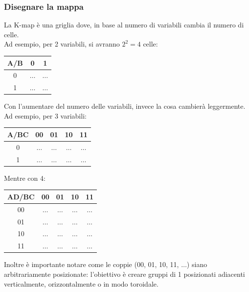 \documentclass[12pt]{article}
\begin{document}
\subsubsection{Disegnare la mappa}
La K-map è una griglia dove, in base al numero di variabili cambia il numero di celle.\\
Ad esempio, per 2 variabili, si avranno $2^2 = 4$ celle:
\begin{center}
    \begin{tabular}{|| c | c c ||}
        \hline
        A/B & 0 & 1\\
        \hline
        0 & $\dots$ & $\dots$\\
        1 & $\dots$ & $\dots$\\
        \hline
    \end{tabular}
\end{center}
Con l'aumentare del numero delle variabili, invece la cosa cambierà leggermente.\\
Ad esempio, per 3 variabili:
\begin{center}
    \begin{tabular}{|| c | c c c c ||}
        \hline
        A/BC & 00 & 01 & 10 & 11\\
        \hline
        0 & $\dots$ & $\dots$ & $\dots$ & $\dots$\\
        \hline
        1 & $\dots$ & $\dots$ & $\dots$ & $\dots$\\
        \hline  
    \end{tabular}
\end{center}
Mentre con 4:
\begin{center}
    \begin{tabular}{|| c | c c c c ||}
        \hline
        AD/BC & 00 & 01 & 10 & 11\\
        \hline
        00 & $\dots$ & $\dots$ & $\dots$ & $\dots$\\
        \hline
        01 & $\dots$ & $\dots$ & $\dots$ & $\dots$\\
        \hline
        10 & $\dots$ & $\dots$ & $\dots$ & $\dots$\\
        \hline
        11 & $\dots$ & $\dots$ & $\dots$ & $\dots$\\
        \hline
    \end{tabular}
\end{center}
Inoltre è importante notare come le coppie (00, 01, 10, 11, $\dots$) siano arbitrariamente posizionate: l'obiettivo è creare gruppi di 1 posizionati adiacenti verticalmente, orizzontalmente o in modo toroidale.
\end{document}
